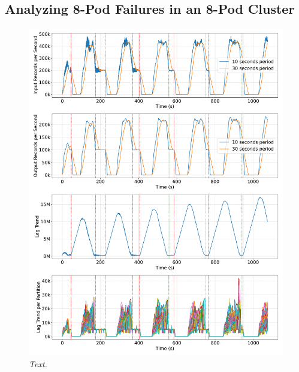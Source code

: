 \subsection{Analyzing 8-Pod Failures in an 8-Pod Cluster}\label{subsec:analyzing-8-pod-failures-in-an-8-pod-cluster}

\begin{figure}[ht]
    \centering
    \includegraphics[width=1\textwidth]{figures/kstreams-8pods/kafka_8_pods_plot_impact}
    \caption{\textit{Text.}}
    \label{fig:kafka-8pods-impact}
\end{figure}


